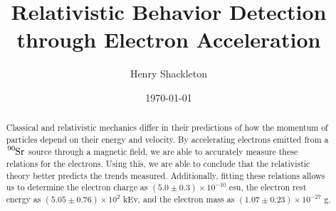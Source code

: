 \usepackage{graphicx}      %
\usepackage{lipsum}
\usepackage{float}
\usepackage{bm}            %
\usepackage{physics}
\usepackage{tensor}
\usepackage[colorlinks=true]{hyperref}  %




\title{Relativistic Behavior Detection through Electron Acceleration}
\author{Henry Shackleton}
\date{\today}


\begin{abstract}
  Classical and relativistic mechanics differ in their predictions of how the momentum of particles depend on their energy and velocity. By accelerating electrons emitted from a $\tensor*[^{90}]{\text{Sr}}{}$ source through a magnetic field, we are able to accurately measure these relations for the electrons. Using this, we are able to conclude that the relativistic theory better predicts the trends measured. Additionally, fitting these relations allows us to determine the electron charge as $(5.0 \pm 0.3) \times 10^{-10}$ esu, the electron rest energy as $(5.05 \pm 0.76) \times 10^{2}$ kEv, and the electron mass as $(1.07 \pm 0.23) \times 10^{-27}$ g.
\end{abstract}

\maketitle
